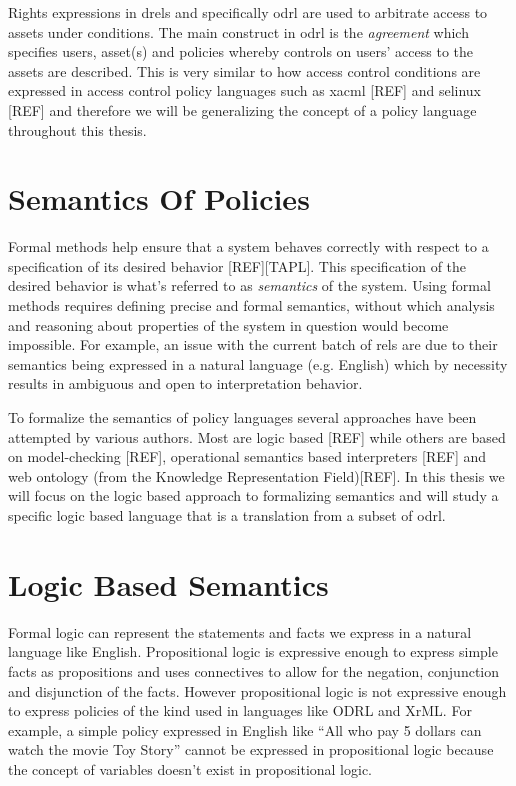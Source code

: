 Rights expressions in \ac{drel}s and specifically \ac{odrl} are used to arbitrate access to assets under conditions. The main construct in \ac{odrl} is the \emph{agreement} which specifies users, asset(s) and policies whereby controls on users' access to the assets are described. This is very similar to how access control conditions are expressed in access control policy languages such as \ac{xacml} [REF] and \ac{selinux} [REF] and therefore we will be generalizing the concept of a policy language throughout this thesis.


\section{Semantics Of Policies}


Formal methods help ensure that a system behaves correctly with respect to a specification of its desired behavior [REF][TAPL]. This specification of the desired behavior is what's referred to as \emph{semantics} of the system. Using formal methods requires defining precise and formal semantics, without which analysis and reasoning about properties of the system in question would become impossible. For example, an issue with the current batch of \ac{rel}s are due to their semantics being expressed in a natural language (e.g. English) which by necessity results in ambiguous and open to interpretation behavior. 

To formalize the semantics of policy languages several approaches have been attempted by various authors. Most are logic based [REF] while others are based on model-checking [REF], operational semantics based interpreters [REF] and web ontology (from the Knowledge Representation Field)[REF]. In this thesis we will focus on the logic based approach to formalizing semantics and will study a specific logic based language that is a translation from a subset of \ac{odrl}.



\section{Logic Based Semantics}


Formal logic can represent the statements and facts we express in a natural language like English. Propositional logic is expressive enough to express simple facts as propositions and uses connectives to allow for the negation, conjunction and disjunction of the facts. However propositional logic is not expressive enough to express policies of the kind used in languages like ODRL and XrML. For example, a simple policy expressed in English like ``All who pay 5 dollars can watch the movie Toy Story'' cannot be expressed in propositional logic because the concept of  variables doesn't exist in propositional logic. 

